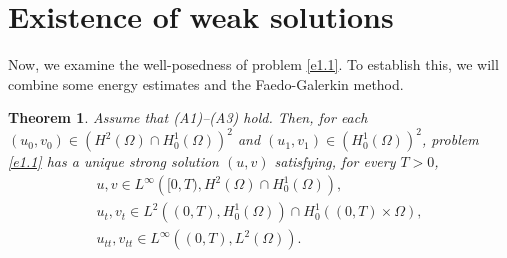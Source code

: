\documentclass[10pt,a4paper]{amsart}
\numberwithin{equation}{section}
\newtheorem{theorem}{Theorem}[section]
\begin{document}
\section{Existence of weak solutions}
Now, we examine the well-posedness of problem \eqref{e1.1}. To establish this, we will combine some energy estimates and the Faedo-Galerkin method.


\begin{theorem} \label{thm3}
 Assume that {\rm (A1)--(A3)} hold.
Then, for each $ (u_0,v_0) \in \left( H^2(\Omega) \cap H^1_0(\Omega)\right)^2$ and
$(u_1,v_1) \in \left( H^1_0(\Omega)\right)^2$, problem \eqref{e1.1} has a unique strong solution
$(u, v)$ satisfying, for every $T > 0$,
\begin{gather*}
u, v \in L^{\infty}\left( [0, T), H^2(\Omega) \cap H^1_0(\Omega)\right),\\
u_{t}, v_{t} \in L^2\left( (0, T), H^1_0(\Omega)\right)\cap H^1_0 \left( (0, T)\times \Omega\right),\\
u_{tt}, v_{tt} \in L^{\infty}\left( (0, T), L^2(\Omega)\right).
\end{gather*}
 \end{theorem}
\end{document}

